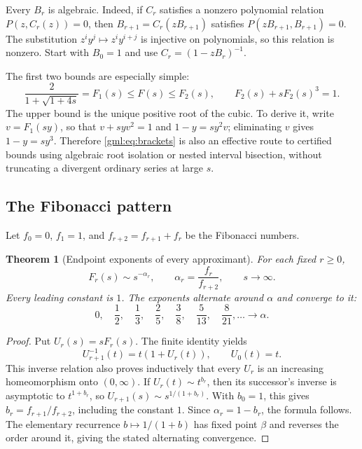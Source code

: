 \documentclass[11pt]{article}
\numberwithin{equation}{section}
\newtheorem{theorem}{Theorem}[section]
\theoremstyle{definition}
\theoremstyle{remark}
\begin{document}
Every $B_r$ is algebraic. Indeed, if $C_r$ satisfies a nonzero polynomial
relation $P(z,C_r(z))=0$, then $B_{r+1}=C_r(zB_{r+1})$ satisfies
$P(zB_{r+1},B_{r+1})=0$. The substitution $z^iy^j\mapsto z^iy^{i+j}$
is injective on polynomials, so this relation is nonzero. Start with
$B_0=1$ and use $C_r=(1-zB_r)^{-1}$.

The first two bounds are especially simple:
\begin{equation}\label{gml:eq:firstbounds}
 \frac{2}{1+\sqrt{1+4s}}=F_1(s)\le F(s)\le F_2(s),
 \qquad F_2(s)+sF_2(s)^3=1.
\end{equation}
The upper bound is the unique positive root of the cubic. To derive it,
write $v=F_1(sy)$, so that $v+syv^2=1$ and $1-y=sy^2v$; eliminating $v$
gives $1-y=sy^3$. Therefore \eqref{gml:eq:brackets} is also an effective route
to certified bounds using algebraic root isolation or nested interval
bisection, without truncating a divergent ordinary series at large $s$.

\subsection{The Fibonacci pattern}
Let $f_0=0$, $f_1=1$, and $f_{r+2}=f_{r+1}+f_r$ be the Fibonacci numbers.
\begin{theorem}[Endpoint exponents of every approximant]\label{gml:thm:fibonacci}
For each fixed $r\ge0$,
\begin{equation}\label{gml:eq:fibpower}
 F_r(s)\sim s^{-\alpha_r},\qquad
 \alpha_r=\frac{f_r}{f_{r+2}},\qquad s\to\infty.
\end{equation}
Every leading constant is $1$. The exponents alternate around $\alpha$
and converge to it:
\[
 0,\quad \frac12,\quad\frac13,\quad\frac25,\quad\frac38,
 \quad\frac5{13},\quad\frac8{21},\ldots\longrightarrow\alpha.
\]
\end{theorem}
\begin{proof}
Put $U_r(s)=sF_r(s)$. The finite identity yields
\[
 U_{r+1}^{-1}(t)=t(1+U_r(t)),\qquad U_0(t)=t.
\]
This inverse relation also proves inductively that every $U_r$ is an
increasing homeomorphism onto $(0,\infty)$. If $U_r(t)\sim t^{b_r}$,
then its successor's inverse is asymptotic to $t^{1+b_r}$, so
$U_{r+1}(s)\sim s^{1/(1+b_r)}$. With $b_0=1$, this gives
$b_r=f_{r+1}/f_{r+2}$, including the constant $1$. Since
$\alpha_r=1-b_r$, the formula follows. The elementary recurrence
$b\mapsto1/(1+b)$ has fixed point $\beta$ and reverses the order around
it, giving the stated alternating convergence.
\end{proof}
\end{document}
